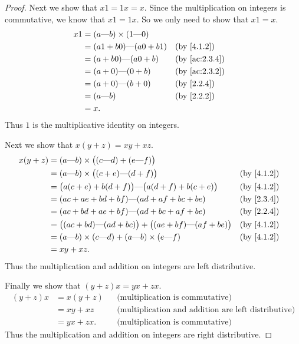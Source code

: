 \begin{proof}
  Next we show that \(x1 = 1x = x\).
  Since the multiplication on integers is commutative, we know that \(x1 = 1x\).
  So we only need to show that \(x1 = x\).
  \begin{align*}
    x1 & = (a \text{---} b) \times (1 \text{---} 0)                                  \\
       & = (a1 + b0) \text{---} (a0 + b1)           &  & \by{4.1.2}                  \\
       & = (a + b0) \text{---} (a0 + b)             &  & \text{(by \cref{ac:2.3.4})} \\
       & = (a + 0) \text{---} (0 + b)               &  & \text{(by \cref{ac:2.3.2})} \\
       & = (a + 0) \text{---} (b + 0)               &  & \by{2.2.4}                  \\
       & = (a \text{---} b)                         &  & \by{2.2.2}                  \\
       & = x.
  \end{align*}
  Thus \(1\) is the multiplicative identity on integers.

  Next we show that \(x(y + z) = xy + xz\).
  \begin{align*}
    x(y + z) & = (a \text{---} b) \times \big((c \text{---} d) + (e \text{---} f)\big)                               \\
             & = (a \text{---} b) \times \big((c + e) \text{---} (d + f)\big)                        &  & \by{4.1.2} \\
             & = \big(a(c + e) + b(d + f)\big) \text{---} \big(a(d + f) + b(c + e)\big)              &  & \by{4.1.2} \\
             & = (ac + ae + bd + bf) \text{---} (ad + af + bc + be)                                  &  & \by{2.3.4} \\
             & = (ac + bd + ae + bf) \text{---} (ad + bc + af + be)                                  &  & \by{2.2.4} \\
             & = \big((ac + bd) \text{---} (ad + bc)\big) + \big((ae + bf) \text{---} (af + be)\big) &  & \by{4.1.2} \\
             & = (a \text{---} b) \times (c \text{---} d) + (a \text{---} b) \times (e \text{---} f) &  & \by{4.1.2} \\
             & = xy + xz.
  \end{align*}
  Thus the multiplication and addition on integers are left distributive.

  Finally we show that \((y + z)x = yx + zx\).
  \begin{align*}
    (y + z)x & = x(y + z) &  & \text{(multiplication is commutative)}                     \\
             & = xy + xz  &  & \text{(multiplication and addition are left distributive)} \\
             & = yx + zx. &  & \text{(multiplication is commutative)}
  \end{align*}
  Thus the multiplication and addition on integers are right distributive.
\end{proof}

